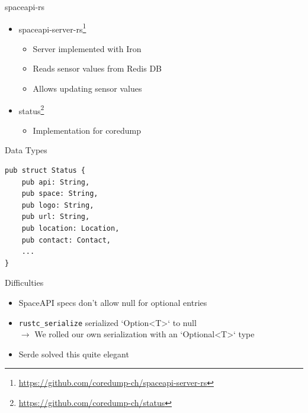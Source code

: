 \begin{frame}[c]{spaceapi-rs}
    \begin{itemize}
        \item spaceapi-server-rs\footnote{\url{https://github.com/coredump-ch/spaceapi-server-rs}}
            \begin{itemize}
                \item Server implemented with Iron
                \item Reads sensor values from Redis DB
                \item Allows updating sensor values
            \end{itemize}
        \item status\footnote{\url{https://github.com/coredump-ch/status}}
            \begin{itemize}
                \item Implementation for coredump
            \end{itemize}
    \end{itemize}
\end{frame}

\begin{frame}[fragile]{Data Types}
    \begin{verbatim}
pub struct Status {
    pub api: String,
    pub space: String,
    pub logo: String,
    pub url: String,
    pub location: Location,
    pub contact: Contact,
    ...
}
    \end{verbatim}
\end{frame}

\begin{frame}[c]{Difficulties}
    \begin{itemize}
        \item SpaceAPI specs don't allow null for optional entries
        \item \texttt{rustc\_serialize} serialized `Option<T>` to null \\
            \pause$\rightarrow$ We rolled our own serialization with an `Optional<T>` type
        \item Serde solved this quite elegant
    \end{itemize}
\end{frame}

